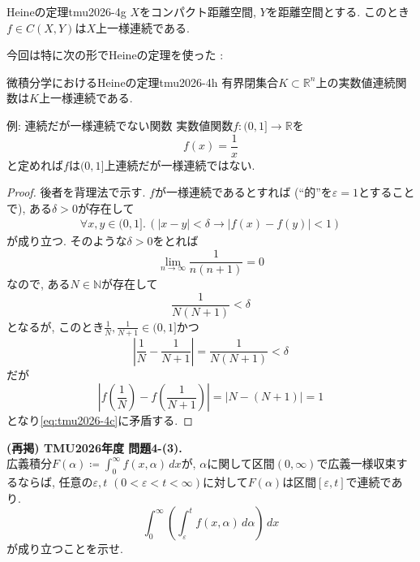 \documentclass[titlepage]{jsarticle}
\numberwithin{equation}{section}
\newcommand{\N}{\mathbb{N}}%
\newcommand{\R}{\mathbb{R}}%
\begin{document}
\begin{thm}{Heineの定理}{tmu2026-4g}
$X$をコンパクト距離空間, $Y$を距離空間とする. このとき$f \in C(X, Y)$は$X$上一様連続である.
\end{thm}
今回は特に次の形でHeineの定理を使った : 
\begin{thm}{微積分学におけるHeineの定理}{tmu2026-4h}
有界閉集合$K \subset \R^n$上の実数値連続関数は$K$上一様連続である.
\end{thm}
\begin{ex}{例: 連続だが一様連続でない関数}
実数値関数$f : (0, 1] \to \R$を
\[
f(x) = \dfrac{1}{x}
\]
と定めれば$f$は$(0, 1]$上連続だが一様連続ではない. 
\end{ex}
\begin{proof}
後者を背理法で示す. $f$が一様連続であるとすれば (``的''を$\varepsilon = 1$とすることで), ある$\delta > 0$が存在して
\begin{align}
\forall x, y \in (0, 1].\,(|x - y| < \delta \to |f(x) - f(y)| < 1) \label{eq:tmu2026-4c}
\end{align}
が成り立つ. そのような$\delta > 0$をとれば
\[
\lim_{n \to \infty} \dfrac{1}{n(n + 1)} = 0
\]
なので, ある$N \in \N$が存在して
\[
\dfrac{1}{N(N+1)} < \delta
\]
となるが, このとき$\frac{1}{N}, \frac{1}{N + 1} \in (0, 1]$かつ
\[
\left|\dfrac{1}{N} - \dfrac{1}{N + 1}\right| = \dfrac{1}{N(N + 1)} < \delta
\]
だが
\[
\left|f\left(\frac{1}{N}\right) - f\left(\frac{1}{N + 1}\right)\right| = |N - (N+1)| = 1 
\]
となり\eqref{eq:tmu2026-4c}に矛盾する.
\end{proof}
\begin{problem}
\textbf{(再掲) TMU2026年度 問題4-(3).}\\
広義積分$\displaystyle{F(\alpha) \coloneq \int_0^\infty f(x, \alpha)\,dx}$が, $\alpha$に関して区間$(0, \infty)$で広義一様収束するならば, 任意の$\varepsilon, t\,\,(0 < \varepsilon < t < \infty)$に対して$F(\alpha)$は区間$[\varepsilon, t]$で連続であり. 
\[
\int_0^\infty \left(\int_\varepsilon^t f(x, \alpha)\,d\alpha\right)\,dx
\]
が成り立つことを示せ.
\end{problem}
\end{document}
